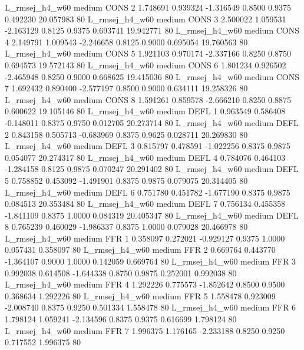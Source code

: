 L_rmsej_h4_w60     medium     CONS                 2  1.748691 0.939324 -1.316549 0.8500 0.9375  0.492230   20.057983 80
L_rmsej_h4_w60     medium     CONS                 3  2.500022 1.059531 -2.163129 0.8125 0.9375  0.693741   19.942771 80
L_rmsej_h4_w60     medium     CONS                 4  2.149791 1.009543 -2.246658 0.8125 0.9000  0.695054   19.760563 80
L_rmsej_h4_w60     medium     CONS                 5  1.921103 0.970174 -2.337166 0.8250 0.8750  0.694573   19.572143 80
L_rmsej_h4_w60     medium     CONS                 6  1.801234 0.926502 -2.465948 0.8250 0.9000  0.668625   19.415036 80
L_rmsej_h4_w60     medium     CONS                 7  1.692432 0.890400 -2.577197 0.8500 0.9000  0.634111   19.258326 80
L_rmsej_h4_w60     medium     CONS                 8  1.591261 0.859578 -2.666210 0.8250 0.8875  0.600622   19.105146 80
L_rmsej_h4_w60     medium     DEFL                 1  0.963549 0.586408 -0.148011 0.8375 0.9750  0.012705   20.273714 80
L_rmsej_h4_w60     medium     DEFL                 2  0.843158 0.505713 -0.683969 0.8375 0.9625  0.028711   20.269830 80
L_rmsej_h4_w60     medium     DEFL                 3  0.815797 0.478591 -1.022256 0.8375 0.9875  0.054077   20.274317 80
L_rmsej_h4_w60     medium     DEFL                 4  0.784076 0.464103 -1.284158 0.8125 0.9875  0.070247   20.291402 80
L_rmsej_h4_w60     medium     DEFL                 5  0.758852 0.453092 -1.491901 0.8375 0.9875  0.079075   20.314405 80
L_rmsej_h4_w60     medium     DEFL                 6  0.751780 0.451782 -1.677190 0.8375 0.9875  0.084513   20.353484 80
L_rmsej_h4_w60     medium     DEFL                 7  0.756134 0.455358 -1.841109 0.8375 1.0000  0.084319   20.405347 80
L_rmsej_h4_w60     medium     DEFL                 8  0.765239 0.460029 -1.986337 0.8375 1.0000  0.079028   20.466978 80
L_rmsej_h4_w60     medium      FFR                 1  0.358097 0.272021 -0.929127 0.9375 1.0000  0.057431    0.358097 80
L_rmsej_h4_w60     medium      FFR                 2  0.669764 0.443770 -1.364107 0.9000 1.0000  0.142059    0.669764 80
L_rmsej_h4_w60     medium      FFR                 3  0.992038 0.614508 -1.644338 0.8750 0.9875  0.252001    0.992038 80
L_rmsej_h4_w60     medium      FFR                 4  1.292226 0.775573 -1.852642 0.8500 0.9500  0.368634    1.292226 80
L_rmsej_h4_w60     medium      FFR                 5  1.558478 0.923009 -2.008740 0.8375 0.9250  0.501334    1.558478 80
L_rmsej_h4_w60     medium      FFR                 6  1.798124 1.059241 -2.134596 0.8375 0.9375  0.616699    1.798124 80
L_rmsej_h4_w60     medium      FFR                 7  1.996375 1.176165 -2.233188 0.8250 0.9250  0.717552    1.996375 80
